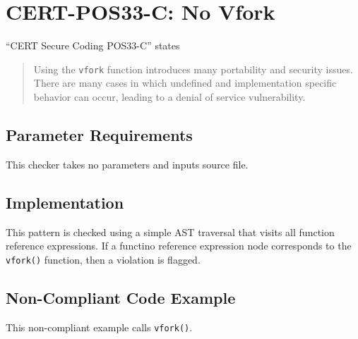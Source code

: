 
\section{CERT-POS33-C: No Vfork}
\label{NoVfork::overview}
``CERT Secure Coding POS33-C'' states
\begin{quote}
Using the {\tt vfork} function introduces many portability and security issues. There are many cases in which undefined and implementation specific behavior can occur, leading to a denial of service vulnerability.
\end{quote}

\subsection{Parameter Requirements}
This checker takes no parameters and inputs source file.

\subsection{Implementation}
This pattern is checked using a simple AST traversal that visits all function reference expressions. If a functino reference expression node corresponds to the {\tt vfork()} function, then a violation is flagged.

\subsection{Non-Compliant Code Example}
This non-compliant example calls {\tt vfork()}.

